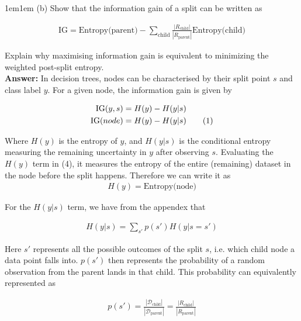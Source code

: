 \documentclass[11pt]{article}
\newcommand\numberthis{\addtocounter{equation}{1}\tag{\theequation}}
\begin{document}
    \begin{adjustwidth}{1em}{1em}
        (b) Show that the information gain of a split can be written as

        \begin{align*}
            \text{IG} = \text{Entropy(parent)} - \sum_{\text{child}}
            \frac{|R_{\text{child}}|}{|R_\text{parent}|} \text{Entropy(child)}
        \end{align*}

        Explain why maximising information gain is equivalent to minimizing the weighted post-split
        entropy. \\ 

        \textbf{Answer:} In decision trees, nodes can be characterised by their split point $s$ and
        class label $y$. For a given node, the information gain is given by 

        \begin{align*}
            \text{IG}(y, s) &= H(y) - H(y | s) \\ 
            \text{IG}(node) &= H(y) - H(y | s) \numberthis
        \end{align*}

        Where $H(y)$ is the entropy of $y$, and $H(y | s)$ is the conditional entropy measuring the
        remaining uncertainty in $y$ after observing $s$. Evaluating the $H(y)$ term in (4), it
        measures the entropy of the entire (remaining) dataset in the node before the split happens.
        Therefore we can write it as \\ 

        \begin{align*}
            H(y) = \text{Entropy(node)}
        \end{align*}

        For the $H(y | s)$ term, we have from the appendex that 
        
        \begin{align*}
            H(y | s) = \sum_{s'}p(s')H(y | s = s')
        \end{align*}

        Here $s'$ represents all the possible outcomes of the split $s$, i.e. which child node a
        data point falls into. $p(s')$ then represents the probability of a random observation
        from the parent lands in that child. This probability can equivalently represented as 

        \begin{align*}
            p(s') = \frac{|\mathcal{D}_\text{child}|}{|\mathcal{D}_{\text{parent}}|} =
            \frac{|R_\text{child}|}{|R_\text{parent}|}
        \end{align*}


\end{adjustwidth}
\end{document}
